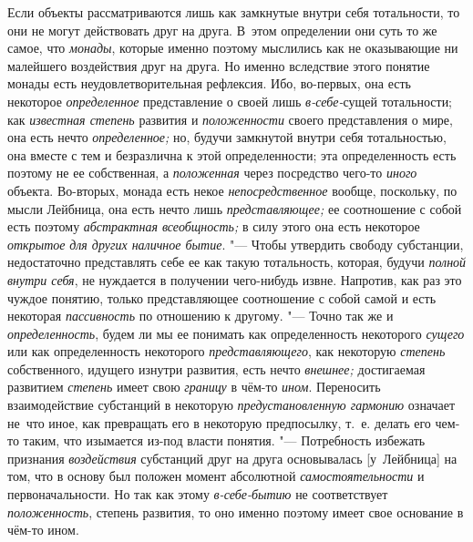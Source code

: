 Если объекты рассматриваются лишь как замкнутые внутри себя
тотальности, то они не могут действовать друг на друга. В~этом определении
они суть то же самое, что {\em монады},
которые именно поэтому мыслились как не оказывающие ни
малейшего воздействия друг на друга. Но именно вследствие этого понятие
монады есть неудовлетворительная рефлексия. Ибо, во-первых, она есть
некоторое {\em определенное} представление о своей лишь {\em в-себе-}сущей
тотальности; как {\em известная степень} развития и {\em положенности} своего
представления о мире, она есть нечто {\em определенное;} но,
будучи замкнутой внутри себя тотальностью, она вместе с тем и безразлична к
этой определенности; эта определенность есть поэтому не ее собственная, а
{\em положенная} через посредство чего-то {\em иного}
объекта. Во-вторых, монада есть некое {\em непосредственное}
вообще, поскольку, по мысли Лейбница, она есть нечто лишь
{\em представляющее;} ее соотношение с собой есть поэтому
{\em абстрактная всеобщность;} в силу этого она есть некоторое
{\em открытое} {\em для других наличное бытие}. "---
Чтобы утвердить свободу субстанции, недостаточно представлять
себе ее как такую тотальность, которая, будучи {\em полной внутри себя},
не нуждается в получении чего-нибудь извне. Напротив, как раз
это чуждое понятию, только представляющее соотношение с собой самой и есть
некоторая {\em пассивность} по отношению к другому. "--- Точно так же и
{\em определенность}, будем ли мы ее понимать как определенность некоторого
{\em сущего} или как определенность некоторого {\em представляющего},
как некоторую {\em степень} собственного, идущего изнутри развития, есть нечто
{\em внешнее;} достигаемая развитием {\em степень} имеет свою
{\em границу} в чём-то {\em ином}. Переносить
взаимодействие субстанций в некоторую
{\em предустановленную гармонию}
означает не~что иное, как превращать его в некоторую
предпосылку, т.~е. делать его чем-то таким, что изымается из-под власти
понятия. "--- Потребность избежать признания {\em воздействия}
субстанций друг на друга основывалась [у~Лейбница] на том,
что в основу был положен момент абсолютной
{\em самостоятельности} и первоначальности. Но так как этому
{\em в-себе-бытию} не соответствует {\em положенность},
степень развития, то оно именно поэтому имеет свое основание в чём-то ином.

